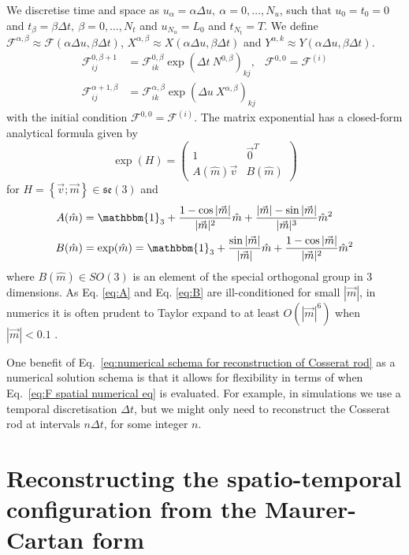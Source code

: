 \documentclass[withindex,glossary,techreport]{cam-thesis}
\begin{document}
We discretise time and space as $u_{\alpha}=\alpha\Delta u,\ \alpha=0,\dots,N_{u}$, such that $u_{0}=t_{0}=0$ and $t_{\beta}=\beta\Delta t,\ \beta=0,\dots,N_{t}$
and $u_{N_{u}}=L_{0}$ and $t_{N_{t}}=T$. We define $\mathcal{F}^{\alpha,\beta}\approx\mathcal{F}(\alpha\Delta u,\beta\Delta t)$,
$X^{\alpha,\beta}\approx X(\alpha\Delta u,\beta\Delta t)$ and $Y^{\alpha,k}\approx Y(\alpha\Delta u,\beta\Delta t)$.
\begin{subequations} \label{eq:numerical schema for reconstruction of Cosserat rod}
\begin{align}
\mathcal{F}_{ij}^{0, \beta+1} & =\mathcal{F}_{ik}^{0, \beta}\exp\left(\Delta t\ N^{0, \beta}\right)_{kj}, & \mathcal{F}^{0,0}=\mathcal{F}^{(i)}\\
\mathcal{F}_{ij}^{\alpha+1, \beta} & =\mathcal{F}_{ik}^{\alpha, \beta}\exp\left(\Delta u\ X^{\alpha,\beta}\right)_{kj} \label{eq:F spatial numerical eq}
\end{align}
\end{subequations}
with the initial condition $\mathcal{F}^{0,0}=\mathcal{F}^{(i)}$.
The matrix exponential has a closed-form analytical formula given
by
\begin{equation}
\exp(H)=\left(\begin{array}{cc}
1 & \vec{0}^{T}\\
A(\hat{m})\vec{v} & B(\hat{m})
\end{array}\right)
\end{equation}
for $H=\left\{ \vec{v};\vec{m}\right\} \in\mathfrak{se}(3)$ and
\begin{subequations} 
\begin{align}
A(\hat{m}) & =\mathbbm{1}_{3}+\frac{1-\cos|\vec{m}|}{|\vec{m}|^{2}}\hat{m}+\frac{|\vec{m}|-\sin|\vec{m}|}{|\vec{m}|^{3}}\hat{m}^{2}\label{eq:A}\\
B(\hat{m}) & =\exp(\hat{m})=\mathbbm{1}_{3}+\frac{\sin|\vec{m}|}{|\vec{m}|}\hat{m}+\frac{1-\cos|\vec{m}|}{|\vec{m}|^{2}}\hat{m}^{2}\label{eq:B}
\end{align}
\end{subequations}
where $B(\hat{m})\in SO(3)$ is an element of the special orthogonal
group in 3 dimensions. As Eq. \ref{eq:A} and Eq. \ref{eq:B} are
ill-conditioned for small $|\vec{m}|$, in numerics it is often prudent
to Taylor expand to at least $O(|\vec{m}|^6)$ when $|\vec{m}| < 0.1$ \citep{giusteriSimulationViscoelasticCosserat2021}.

One benefit of Eq.~\ref{eq:numerical schema for reconstruction of Cosserat rod} as a numerical solution schema is that it allows for flexibility in terms of when Eq.~\ref{eq:F spatial numerical eq} is evaluated. For example, in simulations we use a temporal discretisation $\Delta t$, but we might only need to reconstruct the Cosserat rod at intervals $n \Delta t$, for some integer $n$.

\section{Reconstructing the spatio-temporal configuration from the Maurer-Cartan form} \label{app:Reconstructing the spatio-temporal configuration from the Maurer-Cartan form}



\printthesisindex
\end{document}
